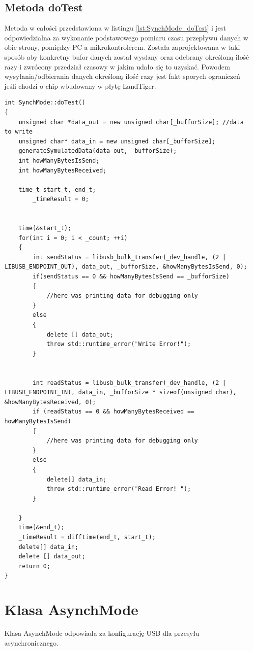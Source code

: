 \documentclass{BscUS}
\begin{document}
\subsection{Metoda doTest}
Metoda w całości przedstawiona w listingu \ref{lst:SynchMode_doTest} i jest odpowiedzialna za wykonanie podstawowego pomiaru czasu przepływu danych w obie strony, pomiędzy PC a mikrokontrolerem.
\newline
Została zaprojektowana w taki sposób aby konkretny bufor danych został wysłany oraz odebrany określoną ilość razy i zwrócony przedział czasowy w jakim udało się to uzyskać. Powodem wysyłania/odbierania danych określoną ilość razy jest fakt sporych ograniczeń jeśli chodzi o chip wbudowany w płytę LandTiger.
\begin{lstlisting}[caption={Metoda SynchMode::doTest()},label={lst:SynchMode_doTest}]
int SynchMode::doTest()
{
	unsigned char *data_out = new unsigned char[_bufforSize]; //data to write
	unsigned char* data_in = new unsigned char[_bufforSize];
	generateSymulatedData(data_out, _bufforSize);
	int howManyBytesIsSend; 
	int howManyBytesReceived;

	time_t start_t, end_t;
    	_timeResult = 0;

	
	time(&start_t);
	for(int i = 0; i < _count; ++i)
	{
		int sendStatus = libusb_bulk_transfer(_dev_handle, (2 | LIBUSB_ENDPOINT_OUT), data_out, _bufforSize, &howManyBytesIsSend, 0); 
		if(sendStatus == 0 && howManyBytesIsSend == _bufforSize)
		{
			//here was printing data for debugging only
		}
		else
		{
			delete [] data_out;
			throw std::runtime_error("Write Error!");
		}
		
		
		int readStatus = libusb_bulk_transfer(_dev_handle, (2 | LIBUSB_ENDPOINT_IN), data_in, _bufforSize * sizeof(unsigned char), &howManyBytesReceived, 0);
		if (readStatus == 0 && howManyBytesReceived == howManyBytesIsSend) 
		{
			//here was printing data for debugging only
		} 
		else 
		{
			delete[] data_in;
			throw std::runtime_error("Read Error! ");
		}
		
	}
	time(&end_t);
	_timeResult = difftime(end_t, start_t);
	delete[] data_in;
	delete [] data_out;
	return 0;
}
\end{lstlisting}
\section{Klasa AsynchMode}
Klasa AsynchMode odpowiada za konfigurację USB dla przesyłu asynchronicznego. 
\end{document}
